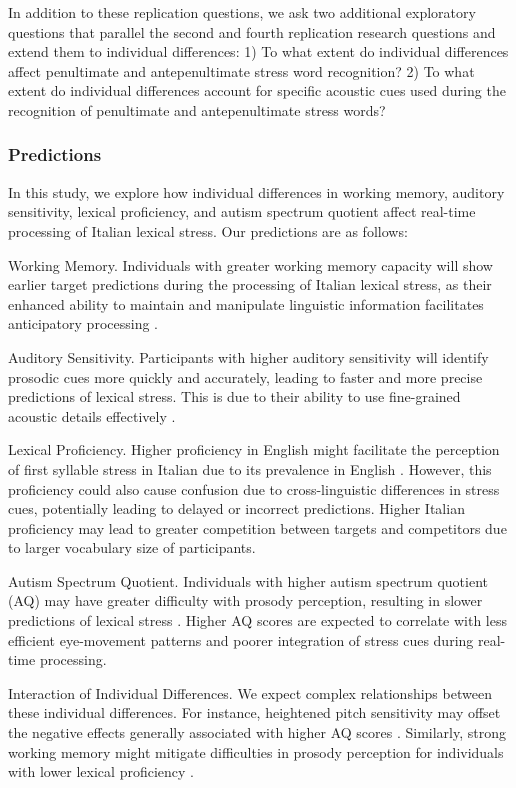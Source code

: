 In addition to these replication questions, we ask two additional exploratory questions that parallel the second and fourth replication research questions and extend them to individual differences: 1) To what extent do individual differences affect penultimate and antepenultimate stress word recognition? 2) To what extent do individual differences account for specific acoustic cues used during the recognition of penultimate and antepenultimate stress words?

\subsubsection{Predictions}

In this study, we explore how individual differences in working memory, auditory sensitivity, lexical proficiency, and autism spectrum quotient affect real-time processing of Italian lexical stress. Our predictions are as follows:

Working Memory.
Individuals with greater working memory capacity will show earlier target predictions during the processing of Italian lexical stress, as their enhanced ability to maintain and manipulate linguistic information facilitates anticipatory processing \citep{Traxler2009, Huettig2016}.

Auditory Sensitivity.
Participants with higher auditory sensitivity will identify prosodic cues more quickly and accurately, leading to faster and more precise predictions of lexical stress. This is due to their ability to use fine-grained acoustic details effectively \citep{nan_2010, goss_2014}.

Lexical Proficiency.
Higher proficiency in English might facilitate the perception of first syllable stress in Italian due to its prevalence in English \citep{cutler2007dutch}. However, this proficiency could also cause confusion due to cross-linguistic differences in stress cues, potentially leading to delayed or incorrect predictions. Higher Italian proficiency may lead to greater competition between targets and competitors due to larger vocabulary size of participants.

Autism Spectrum Quotient.
Individuals with higher autism spectrum quotient (AQ) may have greater difficulty with prosody perception, resulting in slower predictions of lexical stress \citep{schelinski2020speech, grossman2023relationship}. Higher AQ scores are expected to correlate with less efficient eye-movement patterns and poorer integration of stress cues during real-time processing.

Interaction of Individual Differences.
We expect complex relationships between these individual differences. For instance, heightened pitch sensitivity may offset the negative effects generally associated with higher AQ scores \citep{Liu2018}. Similarly, strong working memory might mitigate difficulties in prosody perception for individuals with lower lexical proficiency \citep{Huettig2016}.